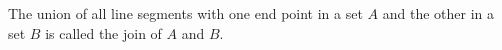 The union of all line segments with one end point in a set $A$ and the other in a set $B$ is called the join of $A$ and $B$.
